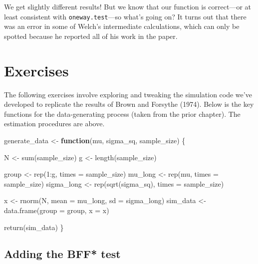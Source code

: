 \documentclass[
]{book}
\newenvironment{Shaded}{\begin{snugshade}}{\end{snugshade}}
\newcommand{\AttributeTok}[1]{\textcolor[rgb]{0.77,0.63,0.00}{#1}}
\newcommand{\ControlFlowTok}[1]{\textcolor[rgb]{0.13,0.29,0.53}{\textbf{#1}}}
\newcommand{\DecValTok}[1]{\textcolor[rgb]{0.00,0.00,0.81}{#1}}
\newcommand{\FunctionTok}[1]{\textcolor[rgb]{0.00,0.00,0.00}{#1}}
\newcommand{\NormalTok}[1]{#1}
\newcommand{\OtherTok}[1]{\textcolor[rgb]{0.56,0.35,0.01}{#1}}
\newcommand{\SpecialCharTok}[1]{\textcolor[rgb]{0.00,0.00,0.00}{#1}}
\begin{document}
We get slightly different results! But we know that our function is correct---or at least consistent with \texttt{oneway.test}---so what's going on? It turns out that there was an error in some of Welch's intermediate calculations, which can only be spotted because he reported all of his work in the paper.

\hypertarget{exercises-1}{%
\section{Exercises}\label{exercises-1}}

The following exercises involve exploring and tweaking the simulation code we've developed to replicate the results of Brown and Forsythe (1974).
Below is the key functions for the data-generating process (taken from the prior chapter).
The estimation procedures are above.

\begin{Shaded}
\begin{Highlighting}[]
\NormalTok{generate\_data }\OtherTok{\textless{}{-}} \ControlFlowTok{function}\NormalTok{(mu, sigma\_sq, sample\_size) \{}

\NormalTok{  N }\OtherTok{\textless{}{-}} \FunctionTok{sum}\NormalTok{(sample\_size) }
\NormalTok{  g }\OtherTok{\textless{}{-}} \FunctionTok{length}\NormalTok{(sample\_size) }
  
\NormalTok{  group }\OtherTok{\textless{}{-}} \FunctionTok{rep}\NormalTok{(}\DecValTok{1}\SpecialCharTok{:}\NormalTok{g, }\AttributeTok{times =}\NormalTok{ sample\_size) }
\NormalTok{  mu\_long }\OtherTok{\textless{}{-}} \FunctionTok{rep}\NormalTok{(mu, }\AttributeTok{times =}\NormalTok{ sample\_size)}
\NormalTok{  sigma\_long }\OtherTok{\textless{}{-}} \FunctionTok{rep}\NormalTok{(}\FunctionTok{sqrt}\NormalTok{(sigma\_sq), }\AttributeTok{times =}\NormalTok{ sample\_size) }
  
\NormalTok{  x }\OtherTok{\textless{}{-}} \FunctionTok{rnorm}\NormalTok{(N, }\AttributeTok{mean =}\NormalTok{ mu\_long, }\AttributeTok{sd =}\NormalTok{ sigma\_long)}
\NormalTok{  sim\_data }\OtherTok{\textless{}{-}} \FunctionTok{data.frame}\NormalTok{(}\AttributeTok{group =}\NormalTok{ group, }\AttributeTok{x =}\NormalTok{ x)}
    
  \FunctionTok{return}\NormalTok{(sim\_data)}
\NormalTok{\}}
\end{Highlighting}
\end{Shaded}

\hypertarget{adding-the-bff-test}{%
\subsection{Adding the BFF* test}\label{adding-the-bff-test}}
\end{document}

